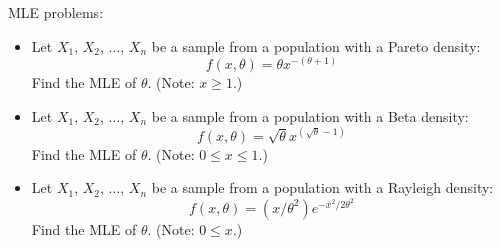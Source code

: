 \documentclass[12pt]{article}
\begin{document}
MLE problems:
\begin{itemize}
\item Let $X_1$, $X_2$, $\ldots$, $X_n$ be a sample from a population
with a Pareto density:
$$f(x,\theta) = \theta x^{-(\theta+1)}$$
Find the MLE of $\theta$.  (Note: $x \ge 1$.)
\item Let $X_1$, $X_2$, $\ldots$, $X_n$ be a sample from a population
with a Beta density:
$$f(x,\theta) = \sqrt\theta x^{(\sqrt\theta-1)}$$
Find the MLE of $\theta$.  (Note: $0 \le x \le 1$.)
\item Let $X_1$, $X_2$, $\ldots$, $X_n$ be a sample from a population
with a Rayleigh density:
$$f(x,\theta) = (x/\theta^2)e^{-x^2/2\theta^2}$$
Find the MLE of $\theta$.  (Note: $0 \le x$.)
\end{itemize}
\end{document}
